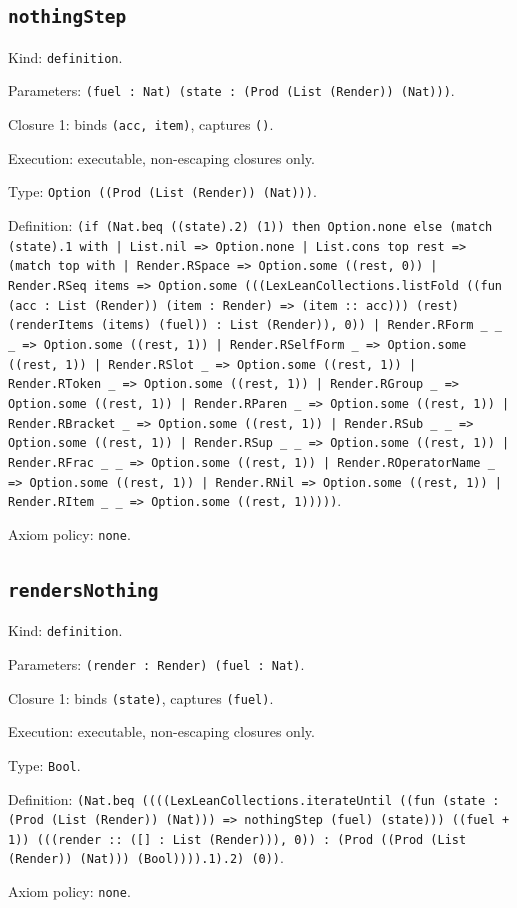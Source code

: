 \documentclass[11pt]{article}
\begin{document}
\subsection*{\texttt{nothingStep}}
\noindent Kind: \texttt{definition}.\par
\noindent Parameters: \texttt{(fuel : Nat) (state : (Prod (List (Render)) (Nat)))}.\par
\noindent Closure 1: binds \texttt{(acc, item)}, captures \texttt{()}.\par
\noindent Execution: executable, non-escaping closures only.\par
\noindent Type: \texttt{Option ((Prod (List (Render)) (Nat)))}.\par
\noindent Definition: \texttt{(if (Nat.beq ((state).2) (1)) then Option.none else (match (state).1 with | List.nil => Option.none | List.cons top rest => (match top with | Render.RSpace => Option.some ((rest, 0)) | Render.RSeq items => Option.some (((LexLeanCollections.listFold ((fun (acc : List (Render)) (item : Render) => (item :: acc))) (rest) (renderItems (items) (fuel)) : List (Render)), 0)) | Render.RForm \_ \_ \_ => Option.some ((rest, 1)) | Render.RSelfForm \_ => Option.some ((rest, 1)) | Render.RSlot \_ => Option.some ((rest, 1)) | Render.RToken \_ => Option.some ((rest, 1)) | Render.RGroup \_ => Option.some ((rest, 1)) | Render.RParen \_ => Option.some ((rest, 1)) | Render.RBracket \_ => Option.some ((rest, 1)) | Render.RSub \_ \_ => Option.some ((rest, 1)) | Render.RSup \_ \_ => Option.some ((rest, 1)) | Render.RFrac \_ \_ => Option.some ((rest, 1)) | Render.ROperatorName \_ => Option.some ((rest, 1)) | Render.RNil => Option.some ((rest, 1)) | Render.RItem \_ \_ => Option.some ((rest, 1)))))}.\par
\noindent Axiom policy: \texttt{none}.\par
\subsection*{\texttt{rendersNothing}}
\noindent Kind: \texttt{definition}.\par
\noindent Parameters: \texttt{(render : Render) (fuel : Nat)}.\par
\noindent Closure 1: binds \texttt{(state)}, captures \texttt{(fuel)}.\par
\noindent Execution: executable, non-escaping closures only.\par
\noindent Type: \texttt{Bool}.\par
\noindent Definition: \texttt{(Nat.beq ((((LexLeanCollections.iterateUntil ((fun (state : (Prod (List (Render)) (Nat))) => nothingStep (fuel) (state))) ((fuel + 1)) (((render :: ([] : List (Render))), 0)) : (Prod ((Prod (List (Render)) (Nat))) (Bool)))).1).2) (0))}.\par
\noindent Axiom policy: \texttt{none}.\par
\end{document}
